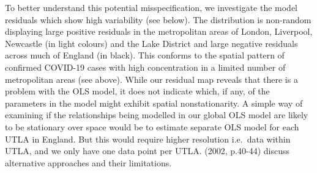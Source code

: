 \documentclass[
]{book}
\begin{document}
To better understand this potential misspecification, we investigate the model residuals which show high variability (see below). The distribution is non-random displaying large positive residuals in the metropolitan areas of London, Liverpool, Newcastle (in light colours) and the Lake District and large negative residuals across much of England (in black). This conforms to the spatial pattern of confirmed COVID-19 cases with high concentration in a limited number of metropolitan areas (see above). While our residual map reveals that there is a problem with the OLS model, it does not indicate which, if any, of the parameters in the model might exhibit spatial nonstationarity. A simple way of examining if the relationships being modelled in our global OLS model are likely to be stationary over space would be to estimate separate OLS model for each UTLA in England. But this would require higher resolution i.e.~data within UTLA, and we only have one data point per UTLA. \citeyearpar{Fotheringham_et_al_2002_book} (2002, p.40-44) discuss alternative approaches and their limitations.
\end{document}
